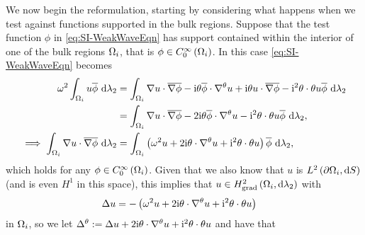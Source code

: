 We now begin the reformulation, starting by considering what happens when we test against functions supported in the bulk regions.
Suppose that the test function $\phi$ in \eqref{eq:SI-WeakWaveEqn} has support contained within the interior of one of the bulk regions $\Omega_i$, that is $\phi\in C^{\infty}_{0}\left( \Omega_i \right)$.
In this case \eqref{eq:SI-WeakWaveEqn} becomes
\begin{align*}
	\omega^2\int_{\Omega_i}u\overline{\phi} \ \mathrm{d}\lambda_2 
	&= \int_{\Omega_i} \nabla u\cdot\overline{\nabla\phi} - \mathrm{i}\theta\overline{\phi}\cdot\nabla^{\theta} u + \mathrm{i}\theta  u\cdot\overline{\nabla\phi} - \mathrm{i}^2\theta\cdot\theta u\overline{\phi}  \ \mathrm{d}\lambda_2 \\
	&= \int_{\Omega_i} \nabla u\cdot\overline{\nabla\phi} - 2\mathrm{i}\theta\overline{\phi}\cdot\nabla^{\theta} u - \mathrm{i}^2\theta\cdot\theta u\overline{\phi}  \ \mathrm{d}\lambda_2, \\
	\implies \int_{\Omega_i} \nabla u\cdot\overline{\nabla\phi}  \ \mathrm{d}\lambda_2
	&= \int_{\Omega_i} \left( \omega^2 u + 2\mathrm{i}\theta\cdot\nabla^{\theta} u + \mathrm{i}^2\theta\cdot\theta u \right) \overline{\phi}  \ \mathrm{d}\lambda_2, 
\end{align*}
which holds for any $\phi\in C^{\infty}_{0}\left( \Omega_i \right)$.
Given that we also know that $u$ is $L^{2}\left( \partial\Omega_i,\mathrm{d} S \right)$ (and is even $H^1$ in this space), this implies that $u\in H^2_\mathrm{grad}\left( \Omega_i, \mathrm{d}\lambda_2 \right)$ with
\begin{align*}
	\Delta u &= -\left(  \omega^2 u + 2\mathrm{i}\theta\cdot\nabla^{\theta} u + \mathrm{i}^2\theta\cdot\theta u  \right)
\end{align*}
in $\Omega_i$, so we let $\Delta^{\theta}:= \Delta u + 2\mathrm{i}\theta\cdot\nabla^{\theta} u + \mathrm{i}^2\theta\cdot\theta u$ and have that
